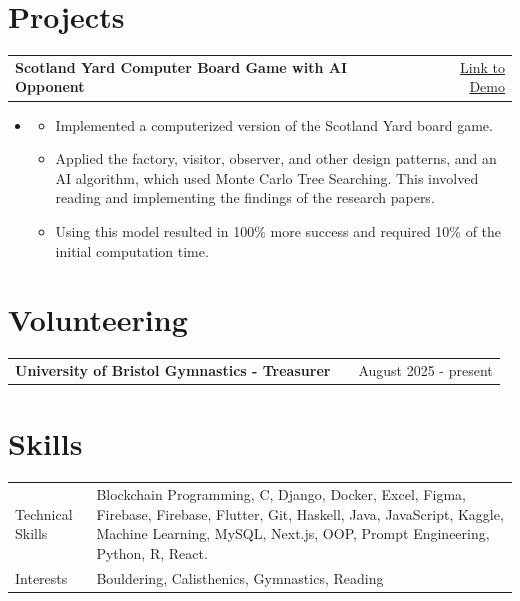 \documentclass[a4paper,12pt]{article}
\makeatletter
\newenvironment{jobshort}[2]
    {
    \begin{tabularx}{\linewidth}{@{}l X r@{}}
    \textbf{#1} & \hfill &  #2 \\[3.75pt]
    \end{tabularx}
    }
    {
    }
\newenvironment{joblong}[2]
    {
    \begin{tabularx}{\linewidth}{@{}l X r@{}}
    \textbf{#1} & \hfill &  #2 \\[3.75pt]
    \end{tabularx}
    \begin{minipage}[t]{\linewidth}
    \begin{itemize}[nosep,after=\strut, leftmargin=0em, itemsep=3pt,label=--]
    }
    {
    \end{itemize}
    \end{minipage}    
    }
\makeatother
\begin{document}
\vspace{-1.5em}

\section{Projects}

\begin{joblong}{Scotland Yard Computer Board Game with AI Opponent}{\href{https://github.com/jammy-jar/Coursework-Scotland-Yard}{Link to Demo}}
\item
\begin{itemize}
\item Implemented a computerized version of the Scotland Yard board game.
\item Applied the factory, visitor, observer, and other design patterns, and an AI algorithm, which used Monte Carlo Tree Searching. This involved reading and implementing the findings of the research papers.
\item Using this model resulted in 100\% more success and required 10\% of the initial computation time.
\end{itemize}
\end{joblong}

\vspace{-1.5em}

\section{Volunteering}
\begin{jobshort}{University of Bristol Gymnastics - Treasurer}{August 2025 - present}
\end{jobshort}

\vspace{-1.5em}

\section{Skills}
\begin{tabularx}{\linewidth}{@{}l X@{}}
Technical Skills &  \normalsize{Blockchain Programming, C, Django, Docker, Excel, Figma, Firebase, Firebase, Flutter, Git, Haskell, Java, JavaScript, Kaggle, Machine Learning, MySQL, Next.js, OOP, Prompt Engineering, Python, R, React.}\\
Interests  &  \normalsize{Bouldering, Calisthenics, Gymnastics, Reading} 
\end{tabularx}

\vfill
{}
\end{document}
